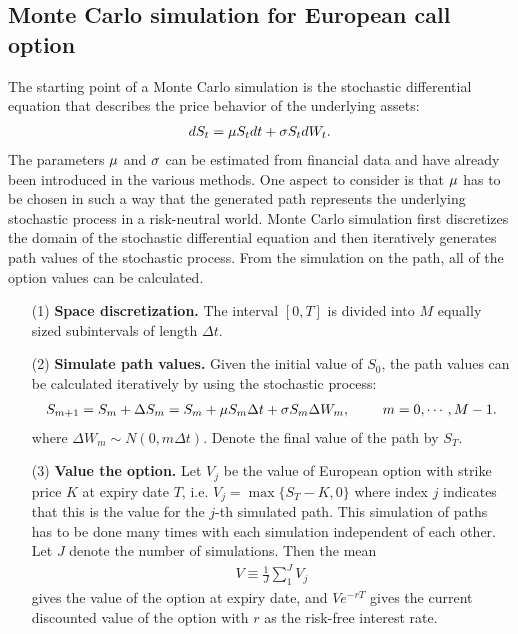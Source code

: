 \documentclass[11pt,letter]{article}
\def\D{\Delta} \def\G{\Gamma} \def\W{\Omega} \def\P{\Phi} \def\L{\Lambda} \def\Th{\Theta} \def\z{\zeta}
\theoremstyle{definition}
\theoremstyle{remark}
\numberwithin{equation}{section}
\begin{document}
\subsection{Monte Carlo simulation for European call option} 
The starting point of a Monte Carlo simulation is the stochastic differential equation that describes the price behavior of the underlying assets:
    \begin{align}
        dS_t=\mu S_tdt+\sigma S_tdW_t.
    \end{align}
    The parameters $\mu$ and $\sigma$ can be estimated from financial data and have already been introduced in the various methods. One aspect to consider is that $\mu$ has to be chosen in such a way that the generated path represents the underlying stochastic process in a risk-neutral world. Monte Carlo simulation first discretizes the domain of the stochastic differential equation and then iteratively generates path values of the stochastic process. From the simulation on the path, all of the option values can be calculated.
    \begin{itemize}
        \item[(1)] \textbf{Space discretization.} The interval $[0,T]$ is divided into $M$ equally sized subintervals of length $\D t$.
        \item[(2)] \textbf{Simulate path values.} Given the initial value of $S_0$, the path values can be calculated iteratively by using the stochastic process:
        \begin{align}
            S_{m+1}=S_m+\D S_m=S_m+\m S_m\D t+\s S_m\D W_m,~~~~~~~m=0,\cdots,M-1.
        \end{align}
        where $\D W_m\sim N(0,m\D t)$. Denote the final value of the path by $S_T$.
        \item[(3)] \textbf{Value the option.} Let $V_j$ be the value of European option with strike price $K$ at expiry date $T$, i.e. $V_j=\max\{S_T-K,0\}$ where index $j$ indicates that this is the value for the $j$-th simulated path. This simulation of paths has to be done many times with each simulation independent of each other. Let $J$ denote the number of simulations. Then the mean
        \begin{align}
            V\equiv\frac{1}{J}\sum_1^JV_j
        \end{align}
        gives the value of the option at expiry date, and $Ve^{-rT}$ gives the current discounted value of the option with $r$ as the risk-free interest rate.
    \end{itemize}
    
\end{document}
